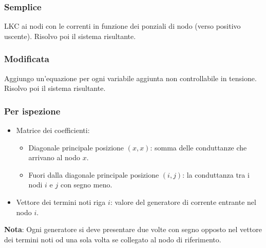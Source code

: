 \documentclass[10pt]{article}
\begin{document}
        \begin{multicols}{2}
            
            \subsubsection*{Semplice}
            
                LKC ai nodi con le correnti in funzione dei ponziali di nodo (verso positivo uscente).
                Risolvo poi il sistema risultante.

            \subsubsection*{Modificata}

                Aggiungo un'equazione per ogni variabile aggiunta non controllabile in tensione.
                Risolvo poi il sistema risultante.

            \vfill\null
            \columnbreak

            \subsubsection*{Per ispezione}

                \begin{itemize}
                    \item Matrice dei coefficienti:
                        \begin{itemize}
                            \item Diagonale principale posizione \((x,x)\): somma delle conduttanze che arrivano al nodo \(x\).
                            \item Fuori dalla diagonale principale posizione \((i,j)\): la conduttanza tra i nodi \(i\) e \(j\) con segno meno.
                        \end{itemize}
                    \item Vettore dei termini noti riga \(i\): valore del generatore di corrente entrante nel nodo \(i\).
                \end{itemize}

        \end{multicols}

        \vspace{-\baselineskip}
        \textbf{Nota}: Ogni generatore si deve presentare due volte con segno opposto nel vettore dei termini noti od una sola volta
        se collegato al nodo di riferimento.
\end{document}
